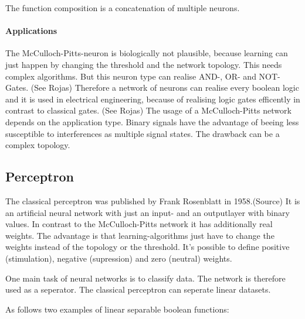 \documentclass[10pt,a4paper,DIV=11]{scrreprt}
\begin{document}
The function composition is a concatenation of multiple neurons. \\

\paragraph*{Applications}
The McCulloch-Pitts-neuron is biologically not plausible, because learning
can just happen by changing the threshold and the network topology. This needs complex algorithms.
But this neuron type can realise AND-, OR- and NOT-Gates. (See Rojas)
Therefore a network of neurons can realise every boolean logic and it is used in electrical engineering, because of realising logic gates efficently in contrast to classical gates. (See Rojas)
The usage of a McCulloch-Pitts network depends on the application type. Binary signals have the advantage of beeing less susceptible to interferences as multiple signal states.
The drawback can be a complex topology.

\subsection{Perceptron}
The classical perceptron was published by Frank Rosenblatt in 1958.(Source)
It is an artificial neural network with just an input- and an outputlayer with binary values. In contrast to the McCulloch-Pitts network it has additionally real weights. The advantage is that learning-algorithms just have to change the weights instead of the topology or the threshold. It's possible to define positive (stimulation), negative (supression) and zero (neutral) weights.

One main task of neural networks is to classify data. The network is therefore used as a seperator.
The classical perceptron can seperate linear datasets. 

As follows two examples of linear separable boolean functions:
\end{document}
